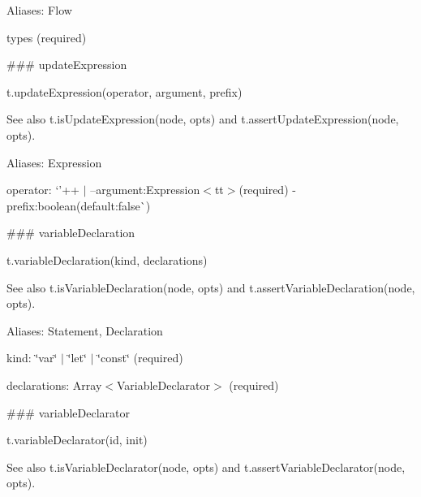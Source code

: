 Aliases\+: {\ttfamily Flow}


\begin{DoxyItemize}
\item {\ttfamily types} (required) 


\end{DoxyItemize}

\#\#\# update\+Expression 
\begin{DoxyCode}
t.updateExpression(operator, argument, prefix)
\end{DoxyCode}


See also {\ttfamily t.\+is\+Update\+Expression(node, opts)} and {\ttfamily t.\+assert\+Update\+Expression(node, opts)}.

Aliases\+: {\ttfamily Expression}


\begin{DoxyItemize}
\item {\ttfamily operator}\+: `'++\textquotesingle{} $\vert$ \textquotesingle{}--argument{\ttfamily \+:}Expression$<$tt$>$(required) -\/prefix{\ttfamily \+:}boolean{\ttfamily (default\+:}false\`{}) 


\end{DoxyItemize}

\#\#\# variable\+Declaration 
\begin{DoxyCode}
t.variableDeclaration(kind, declarations)
\end{DoxyCode}


See also {\ttfamily t.\+is\+Variable\+Declaration(node, opts)} and {\ttfamily t.\+assert\+Variable\+Declaration(node, opts)}.

Aliases\+: {\ttfamily Statement}, {\ttfamily Declaration}


\begin{DoxyItemize}
\item {\ttfamily kind}\+: {\ttfamily \char`\"{}var\char`\"{} $\vert$ \char`\"{}let\char`\"{} $\vert$ \char`\"{}const\char`\"{}} (required)
\item {\ttfamily declarations}\+: {\ttfamily Array$<$Variable\+Declarator$>$} (required) 


\end{DoxyItemize}

\#\#\# variable\+Declarator 
\begin{DoxyCode}
t.variableDeclarator(id, init)
\end{DoxyCode}


See also {\ttfamily t.\+is\+Variable\+Declarator(node, opts)} and {\ttfamily t.\+assert\+Variable\+Declarator(node, opts)}.


